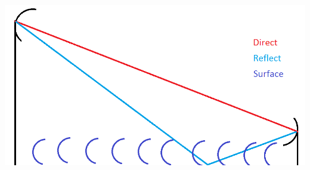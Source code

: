 \documentclass[a0paper,landscape]{baposter}
\begin{document}
\begin{poster}
{\includegraphics[scale=0.4]{pix/intro.png}
\label{fig:name}



}


\end{poster}
\end{document}
